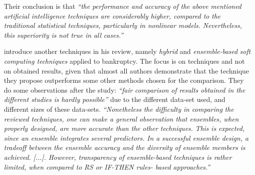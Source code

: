 Their conclusion is that \textit{``the performance and accuracy of the
above mentioned artificial intelligence techniques are considerably
higher, compared to the traditional statistical techniques,
particularly in nonlinear models. Nevertheless, this superiority is
not true in all cases.''}

\cite{verikas2010hybrid} introduce another techniques in his review,
namely \textit{hybrid} and \textit{ensemble-based} \textit{soft
computing techniques} applied to bankruptcy. The focus is on
techniques and not on obtained results, given that almost all authors
demonstrate that the technique they propose outperforms some other
methods chosen for the comparison. They do some observations after the
study: \textit{``fair comparison of results obtained in the different
studies is hardly possible''} due to the different data-set used, and
different sizes of these data-sets. \textit{``Nonetheless the
difficulty in comparing the reviewed techniques, one can make a
general observation that ensembles, when properly designed, are more
accurate than the other techniques. This is expected, since an
ensemble integrates several predictors. In a successful ensemble
design, a tradeoff between the ensemble accuracy and the diversity of
ensemble members is achieved. [...]. However, transparency of
ensemble-based techniques is rather limited, when compared to
\textit{RS} or IF-THEN rules- based approaches.''}


